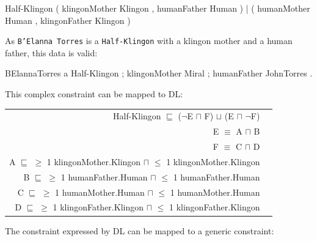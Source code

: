 \documentclass{llncs}
\newcommand{\ms}[1]{\texttt{#1}}
\newenvironment{DL}{
  \vspace{0.3cm}
	\begin{center}
  \begin{tabular}{r l}

}{
  \end{tabular}
	\end{center}
}
\begin{document}
\begin{ex}
Half-Klingon { 
    ( klingonMother Klingon , humanFather Human ) |
    ( humanMother Human , klingonFather Klingon ) }
\end{ex}

As \ms{B'Elanna Torres} is a \ms{Half-Klingon} with a klingon mother and a human father, this data is valid:

\begin{ex}
BElannaTorres a Half-Klingon ;
    klingonMother Miral ; humanFather JohnTorres .
\end{ex}


This complex constraint can be mapped to DL:

\begin{DL}
Half-Klingon $\sqsubseteq$ ($\neg$E $\sqcap$ F) $\sqcup$ (E $\sqcap$ $\neg$F) \\ 
E $\equiv$ A $\sqcap$ B \\
F $\equiv$ C $\sqcap$ D \\
A $\sqsubseteq$ $\geq$ 1 klingonMother.Klingon $\sqcap$ $\leq$ 1 klingonMother.Klingon \\
B $\sqsubseteq$ $\geq$ 1 humanFather.Human $\sqcap$ $\leq$ 1 humanFather.Human \\
C $\sqsubseteq$ $\geq$ 1 humanMother.Human $\sqcap$ $\leq$ 1 humanMother.Human \\
D $\sqsubseteq$ $\geq$ 1 klingonFather.Klingon $\sqcap$ $\leq$ 1 klingonFather.Klingon \\
\end{DL}

The constraint expressed by DL can be mapped to a generic constraint:
\end{document}
